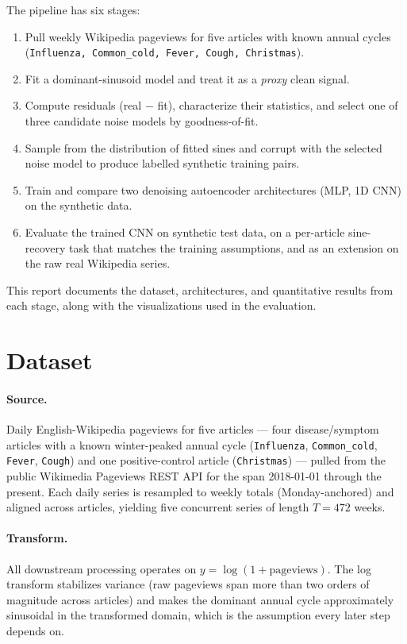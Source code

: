 \documentclass[11pt]{article}
\begin{document}
The pipeline has six stages:
\begin{enumerate}
  \item Pull weekly Wikipedia pageviews for five articles with known annual cycles (\texttt{Influenza, Common\_cold, Fever, Cough, Christmas}).
  \item Fit a dominant-sinusoid model and treat it as a \emph{proxy} clean signal.
  \item Compute residuals (real $-$ fit), characterize their statistics, and select one of three candidate noise models by goodness-of-fit.
  \item Sample from the distribution of fitted sines and corrupt with the selected noise model to produce labelled synthetic training pairs.
  \item Train and compare two denoising autoencoder architectures (MLP, 1D CNN) on the synthetic data.
  \item Evaluate the trained CNN on synthetic test data, on a per-article sine-recovery task that matches the training assumptions, and as an extension on the raw real Wikipedia series.
\end{enumerate}
This report documents the dataset, architectures, and quantitative results from each stage, along with the visualizations used in the evaluation.

\section{Dataset}\label{sec:data}

\paragraph{Source.} Daily English-Wikipedia pageviews for five articles --- four disease/symptom articles with a known winter-peaked annual cycle (\texttt{Influenza}, \texttt{Common\_cold}, \texttt{Fever}, \texttt{Cough}) and one positive-control article (\texttt{Christmas}) --- pulled from the public Wikimedia Pageviews REST API \cite{wikimedia} for the span 2018-01-01 through the present. Each daily series is resampled to weekly totals (Monday-anchored) and aligned across articles, yielding five concurrent series of length $T = 472$ weeks.

\paragraph{Transform.} All downstream processing operates on $y = \log(1 + \text{pageviews})$. The log transform stabilizes variance (raw pageviews span more than two orders of magnitude across articles) and makes the dominant annual cycle approximately sinusoidal in the transformed domain, which is the assumption every later step depends on.
\end{document}
